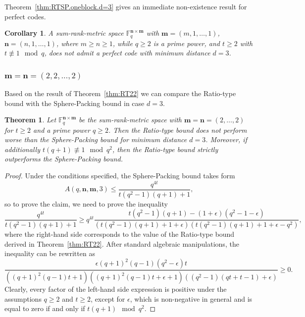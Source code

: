 \documentclass[a4paper]{article}
\newtheorem{corollary}[formula]{Corollary}
\newtheorem{theorem}[formula]{Theorem}
\newcommand{\F}{\mathbb{F}}
\newcommand{\bfn}{\mathbf {n}}
\newcommand{\bfm}{\mathbf {m}}
\newcommand{\spac}{\F^{\bfn\times\bfm}_q}
\begin{document}
Theorem~\ref{thm:RTSP.oneblock.d=3} gives an immediate non-existence result for perfect codes.

\begin{corollary}
    A sum-rank-metric space $\spac$ with $\bfm=(m,1,\dots,1)$, $\bfn=(n,1,\dots,1)$, where $m\geq n\geq1$, while $q\geq 2$ is a prime power, and $t\geq 2$ with $t\not\equiv 1\mod q$, does not admit a perfect code with minimum distance $d=3$.
\end{corollary}

\subsubsection{$\bfm=\bfn=(2,2,\dots,2)$}

Based on the result of Theorem~\ref{thm:RT22} we can compare the Ratio-type bound with the Sphere-Packing bound in case $d=3$.

\begin{theorem}
    Let $\spac$ be the sum-rank-metric space with $\bfm=\bfn=(2,\dots,2)$ for $t\geq2$ and a prime power $q\geq2$. Then the Ratio-type bound does not perform worse than the Sphere-Packing bound for minimum distance $d=3$. Moreover, if additionally $t(q+1)\not\equiv 1\mod q^2$, then the Ratio-type bound strictly outperforms the Sphere-Packing bound.
\end{theorem}

\begin{proof}
    Under the conditions specified, the Sphere-Packing bound takes form
    $$A(q,\bfn,\bfm,3)\leq \frac{q^{4t}}{t (q^2 - 1) (q + 1)+1},$$
    so to prove the claim, we need to prove the inequality
    {\small{
    $$\frac{q^{4t}}{t (q^2 - 1) (q + 1)+1} \geq q^{4t}\frac{t(q^2-1)(q+1)-(1+\epsilon)(q^2-1-\epsilon)}{(t(q^2-1)(q+1)+1+\epsilon)(t(q^2-1)(q+1)+1+\epsilon-q^2)},$$
    }}
    where the right-hand side corresponds to the value of the Ratio-type bound derived in Theorem~\ref{thm:RT22}. After standard algebraic manipulations, the inequality can be rewritten as
    $$\frac{\epsilon (q+1)^2 (q-1) (q^2-\epsilon) t}{((q+1)^2 (q-1) t+1) ((q+1)^2 (q-1) t + \epsilon +1) ((q^2-1) (qt+t-1)+\epsilon)} \geq 0.$$
    Clearly, every factor of the left-hand side expression is positive under the assumptions $q\geq2$ and $t\geq2$, except for $\epsilon$, which is non-negative in general and is equal to zero if and only if $t(q+1)\mod q^2$.
\end{proof}
\end{document}
